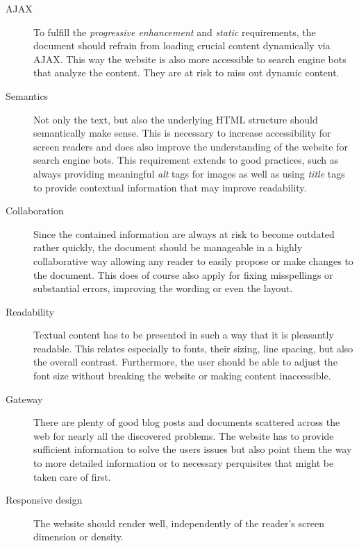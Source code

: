 \begin{description}
	\item[\ac{AJAX}]\hfill

	To fulfill the \textit{progressive enhancement} and \textit{static} requirements, the document should refrain from loading crucial content dynamically via \ac{AJAX}. This way the website is also more accessible to search engine bots that analyze the content. They are at risk to miss out dynamic content.

	\item[Semantics]\hfill

	Not only the text, but also the underlying \ac{HTML} structure should semantically make sense. This is necessary to increase accessibility for screen readers and does also improve the understanding of the website for search engine bots. This requirement extends to good practices, such as always providing meaningful \textit{alt} tags for images as well as using \textit{title} tags to provide contextual information that may improve readability.

	\item[Collaboration]\hfill

	Since the contained information are always at risk to become outdated rather quickly, the document should be manageable in a highly collaborative way allowing any reader to easily propose or make changes to the document. This does of course also apply for fixing misspellings or substantial errors, improving the wording or even the layout.

	\item[Readability]\hfill

	Textual content has to be presented in such a way that it is pleasantly readable. This relates especially to fonts, their sizing, line spacing, but also the overall contrast. Furthermore, the user should be able to adjust the font size without breaking the website or making content inaccessible.

	\item[Gateway]\hfill

	There are plenty of good blog posts and documents scattered across the web for nearly all the discovered problems. The website has to provide sufficient information to solve the users issues but also point them the way to more detailed information or to necessary perquisites that might be taken care of first.

	\item[Responsive design]\hfill

	The website should render well, independently of the reader's screen dimension or density.


\end{description}
